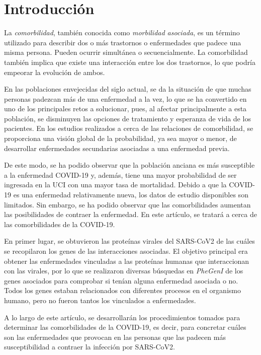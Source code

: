 \section{Introducción}

La \textit{comorbilidad}, también conocida como \textit{morbilidad asociada}, es un término utilizado para describir dos o más trastornos o enfermedades que padece una misma persona. Pueden ocurrir simultánea o secuencialmente. La comorbilidad también implica que existe una interacción entre los dos trastornos, lo que podría empeorar la evolución de ambos.

\newline

En las poblaciones envejecidas del siglo actual, se da la situación de que muchas personas padezcan más de una enfermedad a la vez, lo que se ha convertido en uno de los principales retos a solucionar, pues, al afectar principalmente a esta población, se disminuyen las opciones de tratamiento y esperanza de vida de los pacientes. En los estudios realizados a cerca de las relaciones de comorbilidad, se proporciona una visión global de la probabilidad, ya sea mayor o menor, de desarrollar enfermedades secundarias asociadas a una enfermedad previa.

\newline

De este modo, se ha podido observar que la población anciana es más susceptible a la enfermedad COVID-19 y, además, tiene una mayor probabilidad de ser ingresada en la UCI con una mayor tasa de mortalidad. 
Debido a que la COVID-19 es una enfermedad relativamente nueva, los datos de estudio disponibles son limitados. Sin embargo, se ha podido observar que las comorbilidades aumentan las posibilidades de contraer la enfermedad. En este artículo, se tratará a cerca de las comorbilidades de la COVID-19.

\newline

En primer lugar, se obtuvieron las proteínas virales del SARS-CoV2 de las cuáles se recopilaron los genes de las interacciones asociadas. El objetivo principal era obtener las enfermedades vinculadas a las proteínas humanas que interaccionan con las virales, por lo que se realizaron diversas búsquedas en \textit{PheGenI} de los genes asociados para comprobar si tenían alguna enfermedad asociada o no. Todos los genes estaban relacionados con diferentes procesos en el organismo humano, pero no fueron tantos los vinculados a enfermedades.

\newline

A lo largo de este artículo, se desarrollarán los procedimientos tomados para determinar las comorbilidades de la COVID-19, es decir, para concretar cuáles son las enfermedades que provocan en las personas que las padecen más susceptibilidad a contraer la infección por SARS-CoV2.

